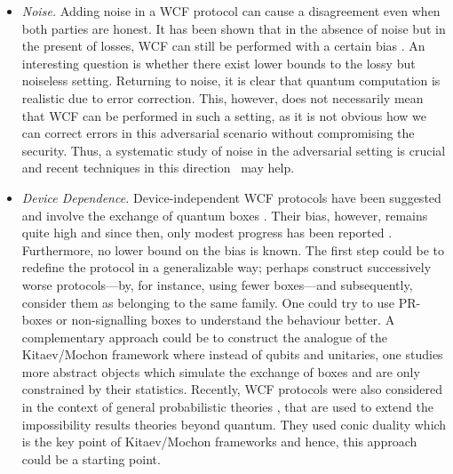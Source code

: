 \documentclass{theoretics}
\begin{document}
\begin{itemize}
  \item \emph{Noise.} Adding noise in a WCF protocol
        can cause a disagreement even when both parties are honest. It has
        been shown that in the absence of noise but in the present of losses, WCF can still be
        performed with a certain bias \cite{Berlin2009}. An interesting
        question is whether there exist lower bounds to the lossy but noiseless setting.
        Returning to noise, it is clear that quantum computation is realistic due to
        error correction.
        This, however, does not necessarily mean that WCF can be performed
        in such a setting, as it is not obvious how we can correct errors
        in this adversarial scenario without compromising the
        security. Thus, a systematic study of noise in the adversarial setting is crucial and recent techniques in this direction~\cite{Gutoski2018} may help.
  \item \emph{Device Dependence.} Device-independent WCF protocols have been suggested and involve the exchange
        of quantum boxes \cite{Aharon2014}.
        Their bias, however, remains quite high and since then, only modest progress has been reported \cite{ASH24}. Furthermore, no lower bound on the bias is known. The first step could
        be to redefine the protocol in a generalizable way; perhaps construct
        successively worse protocols---by, for instance, using fewer boxes---and subsequently, consider them as belonging to the same family.
        One could try to use PR-boxes or non-signalling
        boxes to understand the behaviour better. A complementary approach
        could be to construct the analogue of the Kitaev/Mochon framework
        where instead of qubits and unitaries, one studies more abstract
        objects which simulate the exchange of boxes and are only constrained
        by their statistics. Recently, WCF protocols were also considered in the context of  general probabilistic theories \cite{Sikora2019}, that are used to
        extend the impossibility results theories beyond quantum. They used
        conic duality which is the key point of Kitaev/Mochon frameworks and hence, this approach could be a starting
        point.
\end{itemize}
\end{document}
